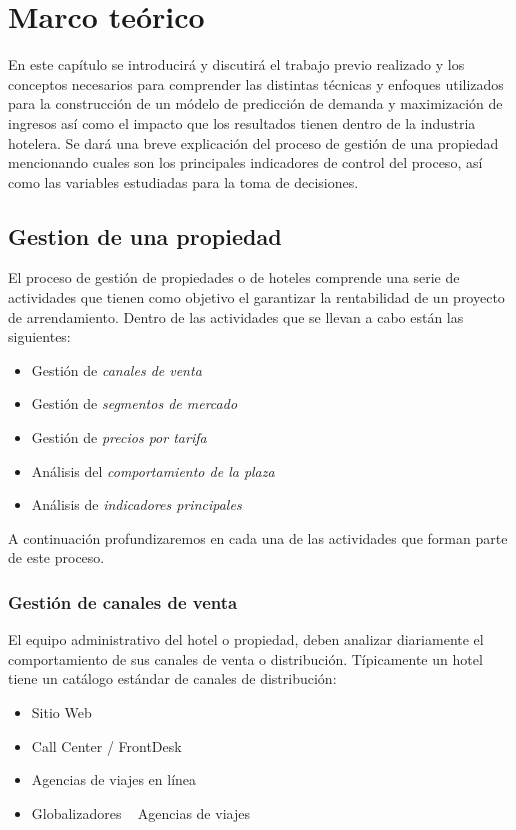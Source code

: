 \chapter{Marco teórico}
\label{ch:marco teorico}

En este capítulo se introducirá y discutirá el trabajo previo realizado y los conceptos necesarios para comprender las distintas técnicas y enfoques utilizados para la construcción de un módelo de predicción de demanda y maximización de ingresos así como el impacto que los resultados tienen dentro de la industria hotelera. Se dará una breve explicación del proceso de gestión de una propiedad mencionando cuales son los principales indicadores de control del proceso, así como las variables estudiadas para la toma de decisiones.

\section*{Gestion de una propiedad}

El proceso de gestión de propiedades o de hoteles comprende una serie de actividades que tienen como objetivo el garantizar la rentabilidad de un proyecto de arrendamiento. Dentro de las actividades que se llevan a cabo están las siguientes:
\begin{itemize}
  \item Gestión de \emph{canales de venta}
  \item Gestión de \emph{segmentos de mercado}
  \item Gestión de \emph{precios por tarifa}
  \item Análisis del \emph{comportamiento de la plaza}
  \item Análisis de \emph{indicadores principales}
\end{itemize}

A continuación profundizaremos en cada una de las actividades que forman parte de este proceso.

\subsection*{Gestión de canales de venta}

El equipo administrativo del hotel o propiedad, deben analizar diariamente el comportamiento de sus canales de venta o distribución. Típicamente un hotel tiene un catálogo estándar de canales de distribución:
\begin{itemize}
  \item Sitio Web 
  \item Call Center / FrontDesk
  \item Agencias de viajes en línea
  \item Globalizadores ~ Agencias de viajes
\end{itemize}

